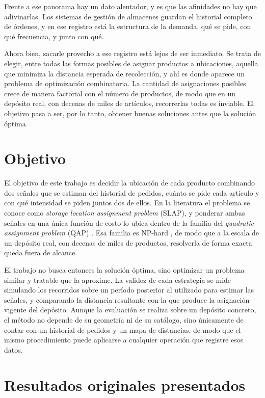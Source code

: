 Frente a ese panorama hay un dato alentador, y es que las afinidades no hay que adivinarlas.
Los sistemas de gestión de almacenes guardan el historial completo de órdenes, y en ese registro está la estructura de la demanda, qué se pide, con qué frecuencia, y junto con qué.

Ahora bien, sacarle provecho a ese registro está lejos de ser inmediato.
Se trata de elegir, entre todas las formas posibles de asignar productos a ubicaciones, aquella que minimiza la distancia esperada de recolección, y ahí es donde aparece un problema de optimización combinatoria.
La cantidad de asignaciones posibles crece de manera factorial con el número de productos, de modo que en un depósito real, con decenas de miles de artículos, recorrerlas todas es inviable.
El objetivo pasa a ser, por lo tanto, obtener buenas soluciones antes que la solución óptima.

\section{Objetivo}

El objetivo de este trabajo es decidir la ubicación de cada producto combinando dos señales que se estiman del historial de pedidos, cuánto se pide cada artículo y con qué intensidad se piden juntos dos de ellos.
En la literatura el problema se conoce como \emph{storage location assignment problem} (SLAP), y ponderar ambas señales en una única función de costo lo ubica dentro de la familia del \emph{quadratic assignment problem} (QAP) \citep{rojasreyes2019slap, koopmans1957assignment}.
Esa familia es NP-hard \citep{loiola2007qap}, de modo que a la escala de un depósito real, con decenas de miles de productos, resolverla de forma exacta queda fuera de alcance.

El trabajo no busca entonces la solución óptima, sino optimizar un problema similar y tratable que la aproxime.
La validez de cada estrategia se mide simulando los recorridos sobre un período posterior al utilizado para estimar las señales, y comparando la distancia resultante con la que produce la asignación vigente del depósito.
Aunque la evaluación se realiza sobre un depósito concreto, el método no depende de su geometría ni de su catálogo, sino únicamente de contar con un historial de pedidos y un mapa de distancias, de modo que el mismo procedimiento puede aplicarse a cualquier operación que registre esos datos.

\section{Resultados originales presentados}

